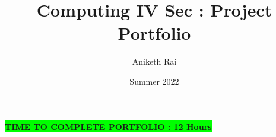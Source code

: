 \documentclass[12pt]{article}
\author{Aniketh Rai}
\date{Summer 2022}
\title{Computing IV Sec \secno: Project Portfolio}
\begin{document}
\maketitle

\tableofcontents


\vfill
\textbf{\colorbox{lime}{TIME TO COMPLETE PORTFOLIO : 12 Hours}}

\newpage

 
\newpage

\newpage

\newpage

\newpage

\newpage

\newpage

\newpage

\newpage

\newpage

\end{document}
